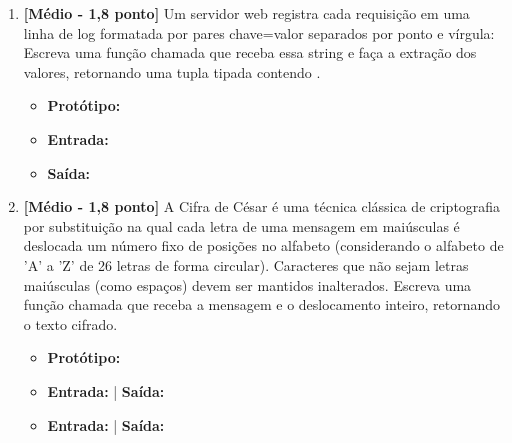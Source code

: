 \begin{enumerate}[label=\textbf{Q\arabic*.}, start=39]


\vspace{0.4cm}

\item \textbf{[Médio - 1,8 ponto]} Um servidor web registra cada requisição em uma linha de log formatada por pares chave=valor separados por ponto e vírgula:
Escreva uma função chamada  que receba essa string e faça a extração dos valores, retornando uma tupla tipada contendo .

\begin{itemize}[leftmargin=*]
    \item \textbf{Protótipo:}\newline {}\\
    \item \textbf{Entrada:} \\
    \item \textbf{Saída:} \\
\end{itemize}



\vspace{0.4cm}

\item \textbf{[Médio - 1,8 ponto]} A Cifra de César é uma técnica clássica de criptografia por substituição na qual cada letra de uma mensagem em maiúsculas é deslocada um número fixo de posições no alfabeto (considerando o alfabeto de 'A' a 'Z' de 26 letras de forma circular). Caracteres que não sejam letras maiúsculas (como espaços) devem ser mantidos inalterados. Escreva uma função chamada  que receba a mensagem e o deslocamento inteiro, retornando o texto cifrado.

\begin{itemize}[leftmargin=*]
    \item \textbf{Protótipo:}\newline {}
    \item \textbf{Entrada:}  | \textbf{Saída:} 
    \item \textbf{Entrada:}  | \textbf{Saída:} 
\end{itemize}


\end{enumerate}
